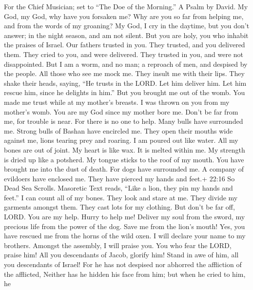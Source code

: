 For the Chief Musician; set to ``The Doe of the Morning.'' A Psalm by
David.  My God, my God, why have you forsaken me? Why are
you so far from helping me, and from the words of my groaning?
 My God, I cry in the daytime, but you don't answer; in the
night season, and am not silent.  But you are holy, you who
inhabit the praises of Israel.  Our fathers trusted in you.
They trusted, and you delivered them.  They cried to you,
and were delivered. They trusted in you, and were not disappointed.
 But I am a worm, and no man; a reproach of men, and
despised by the people.  All those who see me mock me. They
insult me with their lips. They shake their heads, saying, 
``He trusts in the LORD. Let him deliver him. Let him rescue him, since
he delights in him.''  But you brought me out of the womb.
You made me trust while at my mother's breasts.  I was
thrown on you from my mother's womb. You are my God since my mother bore
me.  Don't be far from me, for trouble is near. For there
is no one to help.  Many bulls have surrounded me. Strong
bulls of Bashan have encircled me.  They open their mouths
wide against me, lions tearing prey and roaring.  I am
poured out like water. All my bones are out of joint. My heart is like
wax. It is melted within me.  My strength is dried up like
a potsherd. My tongue sticks to the roof of my mouth. You have brought
me into the dust of death.  For dogs have surrounded me. A
company of evildoers have enclosed me. They have pierced my hands and
feet.+ 22:16 So Dead Sea Scrolls. Masoretic Text reads, ``Like a lion,
they pin my hands and feet.''  I can count all of my bones.
They look and stare at me.  They divide my garments amongst
them. They cast lots for my clothing.  But don't be far
off, LORD. You are my help. Hurry to help me!  Deliver my
soul from the sword, my precious life from the power of the dog.
 Save me from the lion's mouth! Yes, you have rescued me
from the horns of the wild oxen.  I will declare your name
to my brothers. Amongst the assembly, I will praise you. 
You who fear the LORD, praise him! All you descendants of Jacob, glorify
him! Stand in awe of him, all you descendants of Israel! 
For he has not despised nor abhorred the affliction of the afflicted,
Neither has he hidden his face from him; but when he cried to him, he
